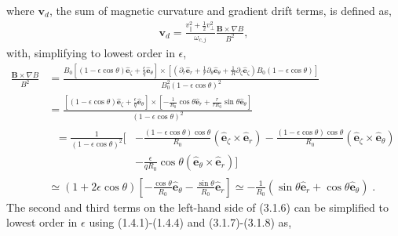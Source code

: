 \documentclass[12pt]{article}
\numberwithin{equation}{subsection}
\begin{document}
where $\bm{v}_d$, the sum of magnetic curvature and gradient drift terms, is defined as,
   \begin{equation}
   \begin{aligned}
      \bm{v}_d = \frac{v_\parallel^2 + \frac{1}{2} v_\perp^2}{\omega_{c,j}}\frac{\bm{B}\times\nabla B}{B^2},
   \end{aligned}
   \end{equation}
with, simplifying to lowest order in $\epsilon$,
   \begin{equation}
   \begin{aligned}
      \frac{\bm{B}\times\nabla B}{B^2} &= \frac{B_0[(1-\epsilon\cos\theta)\bm{\hat{e}}_\zeta + \frac{\epsilon}{q}\bm{\hat{e}}_\theta]
      \times[(\partial_r\bm{\hat{e}}_r + \frac{1}{r}\partial_\theta\bm{\hat{e}}_\theta + \frac{1}{R}\partial_\zeta\bm{\hat{e}}_\zeta)
      B_0(1-\epsilon\cos\theta)]}{B_0^2(1-\epsilon\cos\theta)^2} \\ &=
      \frac{[(1-\epsilon\cos\theta)\bm{\hat{e}}_\zeta + \frac{\epsilon}{q}\bm{\hat{e}}_\theta]
      \times[-\frac{1}{R_0}\cos\theta\bm{\hat{e}}_r + \frac{r}{r R_0}\sin\theta\bm{\hat{e}}_\theta]}{(1-\epsilon\cos\theta)^2} \\ &
      \begin{aligned}
         \;= \frac{1}{(1-\epsilon\cos\theta)^2}[&-\frac{(1-\epsilon\cos\theta)\cos\theta}{R_0}(\bm{\hat{e}}_\zeta\times\bm{\hat{e}}_r)
                                                 -\frac{(1-\epsilon\cos\theta)\cos\theta}{R_0}(\bm{\hat{e}}_\zeta\times\bm{\hat{e}}_\theta) \\
                                                &-\frac{\epsilon}{q R_0}\cos\theta(\bm{\hat{e}}_\theta\times\bm{\hat{e}}_r)]
      \end{aligned}         
      \\ &\simeq (1+2\epsilon\cos\theta)[-\frac{\cos\theta}{R_0}\bm{\hat{e}}_\theta-\frac{\sin\theta}{R_0}\bm{\hat{e}}_r]
          \simeq -\frac{1}{R_0}(\sin\theta\bm{\hat{e}}_r + \cos\theta\bm{\hat{e}}_\theta)\;.
   \end{aligned}
   \end{equation}
The second and third terms on the left-hand side of (3.1.6) can be simplified to lowest order in $\epsilon$ using (1.4.1)-(1.4.4) and
(3.1.7)-(3.1.8) as,
\end{document}
